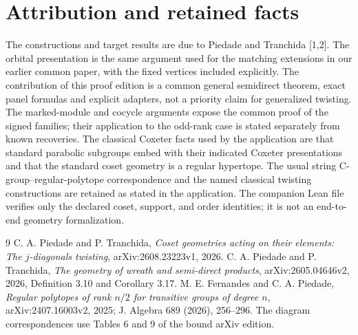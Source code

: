 

\section{Attribution and retained facts}
The constructions and target results are due to Piedade and Tranchida [1,2]. The orbital presentation is the same argument used for the matching extensions in our earlier common paper, with the fixed vertices included explicitly. The contribution of this proof edition is a common general semidirect theorem, exact panel formulas and explicit adapters, not a priority claim for generalized twisting. The marked-module and cocycle arguments expose the common proof of the signed families; their application to the odd-rank case is stated separately from known recoveries. The classical Coxeter facts used by the application are that standard parabolic subgroups embed with their indicated Coxeter presentations and that the standard coset geometry is a regular hypertope. The usual string C-group--regular-polytope correspondence and the named classical twisting constructions are retained as stated in the application. The companion Lean file verifies only the declared coset, support, and order identities; it is not an end-to-end geometry formalization.
\begin{thebibliography}{9}
 C. A. Piedade and P. Tranchida, \emph{Coset geometries acting on their elements: The $j$-diagonals twisting}, arXiv:2608.23223v1, 2026.
 C. A. Piedade and P. Tranchida, \emph{The geometry of wreath and semi-direct products}, arXiv:2605.04646v2, 2026, Definition 3.10 and Corollary 3.17.
 M. E. Fernandes and C. A. Piedade, \emph{Regular polytopes of rank $n/2$ for transitive groups of degree $n$}, arXiv:2407.16003v2, 2025; J. Algebra 689 (2026), 256--296. The diagram correspondences use Tables 6 and 9 of the bound arXiv edition.
\end{thebibliography}

